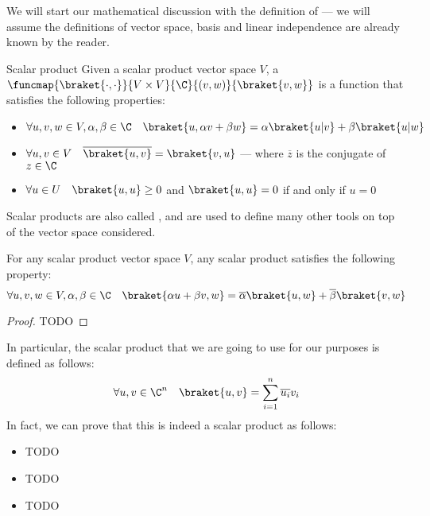\documentclass[a4paper, 12pt]{report}
\begin{document}
We will start our mathematical discussion with the definition of  --- we will assume the definitions of vector space, basis and linear independence are already known by the reader.

\begin{frameddefn}{Scalar product}
	Given a scalar product vector space $V$, a  $\funcmap{\braket{\cdot , \cdot }}{V \times V}{\C}{(v, w)}{\braket{v,w}}$ is a function that satisfies the following properties:

	\begin{itemize}
		\item $\forall u, v, w \in V, \alpha, \beta \in \C \quad \braket{u,\alpha v + \beta w} = \alpha \braket{u|v} + \beta \braket{u| w}$
		\item $\forall u, v \in V \quad \overline{\braket{u,v}} = \braket{v, u}$ --- where $\overline z$ is the conjugate of $z \in \C$
		\item $\forall u \in U \quad \braket{u, u} \ge 0$ and $\braket{u, u} = 0$ if and only if $u = 0$
	\end{itemize}
\end{frameddefn}

Scalar products are also called , and are used to define many other tools on top of the vector space considered.

\begin{framedprop}{}
	For any scalar product vector space $V$, any scalar product satisfies the following property: $$\forall u, v, w \in V, \alpha, \beta \in \C \quad \braket{\alpha u + \beta v, w} = \overline \alpha \braket{u, w} + \overline \beta \braket{v, w}$$
\end{framedprop}

\begin{proof}
	TODO 
\end{proof}

In particular, the scalar product that we are going to use for our purposes is defined as follows: $$\forall u, v \in \C^n \quad \braket{u, v} = \sum_{i = 1}^n{\overline{u_i} v_i}$$ In fact, we can prove that this is indeed a scalar product as follows:

\begin{itemize}
	\item TODO 
	\item TODO 
	\item TODO 
\end{itemize}
\end{document}
